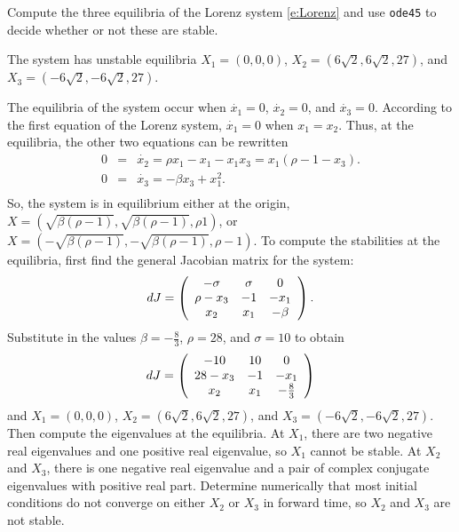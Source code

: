 \documentclass{ximera}
\begin{document}
\begin{computerExercise} \label{c11.4.1}
Compute the three equilibria of the Lorenz system \eqref{e:Lorenz}
and use {\tt ode45} to decide whether or not these are stable.

\begin{solution}
\ans The system has unstable equilibria $X_1 = (0,0,0)$, 
$X_2 = (6\sqrt{2},6\sqrt{2},27)$, and $X_3 = (-6\sqrt{2},-6\sqrt{2},27)$.

\soln The equilibria of the system occur when $\dot{x_1} = 0$, $\dot{x_2}
= 0$, and $\dot{x_3} = 0$.  According to the first equation of the Lorenz
system, $\dot{x_1} = 0$ when $x_1 = x_2$.  Thus, at the equilibria, the
other two equations can be rewritten
\[
\begin{array}{rcl}
0 & = & \dot{x_2} = \rho x_1 - x_1 - x_1x_3 = x_1(\rho - 1 - x_3). \\
0 & = & \dot{x_3} = -\beta x_3 + x_1^2. \\
\end{array}
\]
So, the system is in equilibrium either at the origin, $X =
(\sqrt{\beta (\rho - 1)}, \sqrt{\beta (\rho - 1)}, \rho 1)$, or
$X = (-\sqrt{\beta (\rho - 1)}, -\sqrt{\beta (\rho - 1)}, \rho - 1)$.
To compute the stabilities at the equilibria, first find the general
Jacobian matrix for the system:
\[
dJ = \left(\begin{array}{ccc} -\sigma & \sigma & 0 \\ \rho - x_3 & -1 & -x_1 \\ x_2 & x_1 & -\beta\end{array}\right).
\]
Substitute in the values $\beta = -\frac{8}{3}$, $\rho = 28$, and $\sigma
= 10$ to obtain
\[
dJ = \left(\begin{array}{ccc} -10 & 10 & 0 \\ 28 - x_3 & -1 & -x_1 \\ x_2 & x_1 & -\frac{8}{3}\end{array}\right)
\]
and $X_1 = (0,0,0)$, $X_2 = (6\sqrt{2},6\sqrt{2},27)$, and
$X_3 = (-6\sqrt{2},-6\sqrt{2},27)$.  Then compute the eigenvalues at the
equilibria.  At $X_1$, there are two negative real eigenvalues and one 
positive real eigenvalue, so $X_1$ cannot be stable.  At $X_2$ and $X_3$,
there is one negative real eigenvalue and a pair of complex conjugate
eigenvalues with positive real part.  Determine numerically that most
initial conditions do not converge on either $X_2$ or $X_3$ in forward time,
so $X_2$ and $X_3$ are not stable.


\end{solution}
\end{computerExercise}
\end{document}
